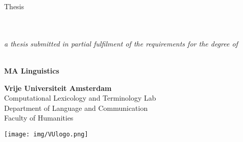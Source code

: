 %
%




\date{February 29, 2020}


\pagestyle{empty}
\begin{titlepage}

\centering\Large


  {\Large\showttype Thesis\\}
  \vspace{2cm}
  {\Huge\showtitle\\}
  \vspace{1.2cm}
  {\huge\showauthor\\}

  \vspace{2cm}
  \parbox{0.7\textwidth}{\centering\large\em a thesis submitted in partial fulfilment of the requirements for the degree of}\\
  \vspace{0.4cm}
  {\Large \bf MA Linguistics}\\
  \showtrack

  \vspace{2cm}
  {\Large {\bf Vrije Universiteit Amsterdam}} \\
  \vspace{0.4cm}
  {\Large  Computational Lexicology and Terminology Lab\\
	Department of Language and Communication\\
	Faculty of Humanities}
  \vspace{0.8cm}

  \texttt{[image: img/VUlogo.png]}

  \vspace{2cm}
  \@date
  \vfill


  {\normalsize}\showsupers

\end{titlepage}
